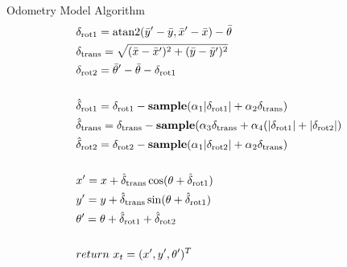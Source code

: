 \documentclass[14pt]{beamer}
\begin{document}
\begingroup
\footnotesize
\begin{frame}{Odometry Model Algorithm}
\begin{align}
&\delta_{\text{rot1}} = \text{atan2}(\bar{y}' - \bar{y}, \bar{x}' - \bar{x}) - \bar{\theta}\\ 
&\delta_{\text{trans}} = \sqrt{(\bar{x} - \bar{x}')^2 + (\bar{y} - \bar{y}')^2}\\
&\delta_{\text{rot2}} = \bar{\theta}' - \bar{\theta} - \delta_{\text{rot1}}\\
\notag \\
&\hat{\delta}_{\text{rot1}} = \delta_{\text{rot1}} - \textbf{sample}(\alpha_1\lvert\delta_{\text{rot1}}\rvert + \alpha_2\delta_{\text{trans}})\\
&\hat{\delta}_{\text{trans}} = \delta_{\text{trans}} - \textbf{sample}(\alpha_3\delta_{\text{trans}} + \alpha_4(\lvert\delta_{\text{rot1}}\rvert + \lvert\delta_{\text{rot2}}\rvert)\\
&\hat{\delta}_{\text{rot2}} = \delta_{\text{rot2}} - \textbf{sample}(\alpha_1\lvert\delta_{\text{rot2}}\rvert + \alpha_2\delta_{\text{trans}})\\
\notag \\
&x' = x + \hat{\delta}_{\text{trans}}\cos(\theta + \hat{\delta}_{\text{rot1}})\\
&y' = y + \hat{\delta}_{\text{trans}}\sin(\theta + \hat{\delta}_{\text{rot1}})\\
&\theta' = \theta + \hat{\delta}_{\text{rot1}} + \hat{\delta}_{\text{rot2}}\\
\notag \\
&return \ x_t = (x', y', \theta')^T
\end{align}
\setcounter{equation}{0}
\end{frame}
\endgroup
\end{document}
